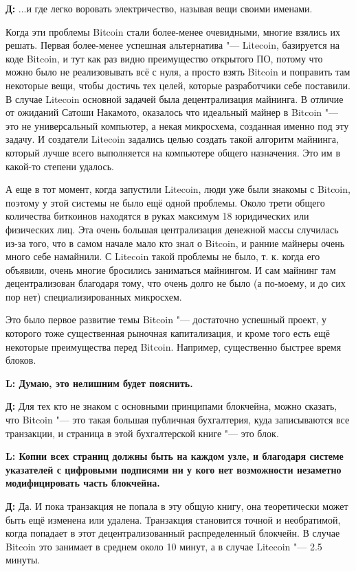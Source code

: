 \documentclass[10pt, a5paper]{article}
\begin{document}
{\noindent \bf Д:} ...и где легко воровать электричество, называя вещи своими именами.

Когда эти проблемы Bitcoin стали более-менее очевидными, многие взялись их решать. Первая более-менее успешная альтернатива "--- Litecoin, базируется на коде Bitcoin, и тут как раз видно преимущество открытого ПО, потому что можно было не реализовывать всё с нуля, а просто взять Bitcoin и поправить там некоторые вещи, чтобы достичь тех целей, которые разработчики себе поставили. В случае Litecoin основной задачей была децентрализация майнинга. В отличие от ожиданий Сатоши Накамото, оказалось что идеальный майнер в Bitcoin "--- это не универсальный компьютер, а некая микросхема, созданная именно под эту задачу. И создатели Litecoin задались целью создать такой алгоритм майнинга, который лучше всего выполняется на компьютере общего назначения. Это им в какой-то степени удалось. 

А еще в тот момент, когда запустили Litecoin, люди уже были знакомы с Bitcoin, поэтому у этой системы не было ещё одной проблемы. Около трети общего количества биткоинов находятся в руках максимум 18 юридических или физических лиц. Эта очень большая централизация денежной массы случилась из-за того, что в самом начале мало кто знал о Bitcoin, и ранние майнеры очень много себе намайнили. С Litecoin такой проблемы не было, т. к. когда его объявили, очень многие бросились заниматься майнингом. И сам майнинг там децентрализован благодаря тому, что очень долго не было (а по-моему, и до сих пор нет) специализированных микросхем. 

Это было первое развитие темы Bitcoin "--- достаточно успешный проект, у которого тоже существенная рыночная капитализация, и кроме того есть ещё некоторые преимущества перед Bitcoin. Например, существенно быстрее время блоков. 


{\noindent \bf L: Думаю, это нелишним будет пояснить.}

{\noindent \bf Д:} Для тех кто не знаком с основными принципами блокчейна, можно сказать, что Bitcoin "--- это такая большая публичная бухгалтерия, куда записываются все транзакции, и страница в этой бухгалтерской книге "--- это блок.

{\noindent \bf L: Копии всех страниц должны быть на каждом узле, и благодаря системе указателей с цифровыми подписями ни у кого нет возможности незаметно модифицировать часть блокчейна.}

{\noindent \bf Д:} Да. И пока транзакция не попала в эту общую книгу, она теоретически может быть ещё изменена или удалена. Транзакция становится точной и необратимой, когда попадает в этот децентрализованный распределенный блокчейн. В случае Bitcoin это занимает в среднем около 10 минут, а в случае Litecoin "--- 2.5 минуты. 
\end{document}
